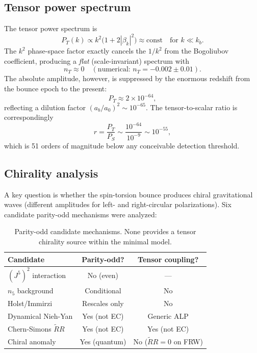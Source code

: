 \documentclass[aps,prd,twocolumn,superscriptaddress,showpacs,preprintnumbers,
  nofootinbib,longbibliography,floatfix]{revtex4-2}
\begin{document}
\subsection{Tensor power spectrum}

The tensor power spectrum is
\begin{equation}\label{eq:PT}
  P_T(k) \propto k^2\bigl(1 + 2|\beta_k|^2\bigr) \approx \text{const}
  \quad \text{for } k \ll k_b.
\end{equation}
The $k^2$ phase-space factor exactly cancels the $1/k^2$ from the
Bogoliubov coefficient, producing a \textit{flat} (scale-invariant)
spectrum with
\begin{equation}\label{eq:nT}
  n_T \approx 0 \quad (\text{numerical: } n_T = -0.002 \pm 0.01).
\end{equation}
The absolute amplitude, however, is suppressed by the enormous redshift
from the bounce epoch to the present:
\begin{equation}\label{eq:PT_amplitude}
  \boxed{P_T \approx 2 \times 10^{-64},}
\end{equation}
reflecting a dilution factor $(a_b/a_0)^2 \sim 10^{-65}$. The
tensor-to-scalar ratio is correspondingly
\begin{equation}\label{eq:r}
  r = \frac{P_T}{P_S} \sim \frac{10^{-64}}{10^{-9}} \sim 10^{-55},
\end{equation}
which is 51 orders of magnitude below any conceivable detection
threshold.

\subsection{Chirality analysis}

A key question is whether the spin-torsion bounce produces chiral
gravitational waves (different amplitudes for left- and right-circular
polarizations). Six candidate parity-odd mechanisms were analyzed:

\begin{table}[t]
\centering
\caption{\label{tab:parity} Parity-odd candidate mechanisms. None
provides a tensor chirality source within the minimal model.}
\begin{ruledtabular}
\begin{tabular}{lcc}
\textbf{Candidate} & \textbf{Parity-odd?} & \textbf{Tensor coupling?} \\
\hline
$(J^5)^2$ interaction & No (even) & --- \\
$n_5$ background & Conditional & No \\
Holst/Immirzi & Rescales only & No \\
Dynamical Nieh-Yan & Yes (not EC) & Generic ALP \\
Chern-Simons $\tilde{R}R$ & Yes (not EC) & Yes (not EC) \\
Chiral anomaly & Yes (quantum) & No ($\tilde{R}R=0$ on FRW) \\
\end{tabular}
\end{ruledtabular}
\end{table}
\end{document}
